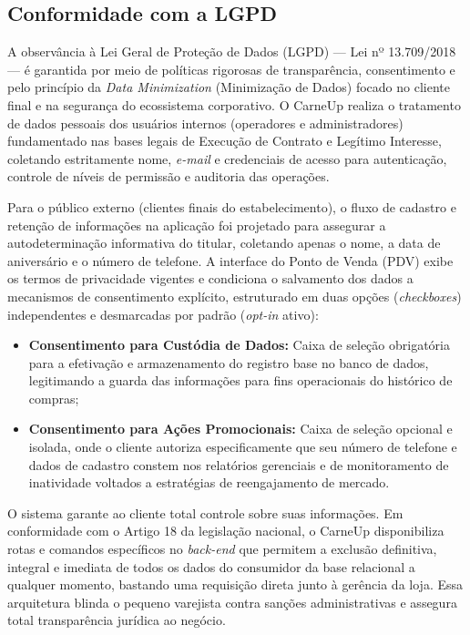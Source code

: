 \documentclass[
	12pt,				%
	openany,			%
	oneside,			%
	a4paper,			%
	english,			%
	french,				%
	spanish,			%
	brazil				%
	]{abntex2}
\begin{document}
\subsection{Conformidade com a LGPD}

A observância à Lei Geral de Proteção de Dados (LGPD) --- Lei nº 13.709/2018 --- é garantida por meio de políticas rigorosas de transparência, consentimento e pelo princípio da \textit{Data Minimization} (Minimização de Dados) focado no cliente final e na segurança do ecossistema corporativo. O CarneUp realiza o tratamento de dados pessoais dos usuários internos (operadores e administradores) fundamentado nas bases legais de Execução de Contrato e Legítimo Interesse, coletando estritamente nome, \textit{e-mail} e credenciais de acesso para autenticação, controle de níveis de permissão e auditoria das operações.

Para o público externo (clientes finais do estabelecimento), o fluxo de cadastro e retenção de informações na aplicação foi projetado para assegurar a autodeterminação informativa do titular, coletando apenas o nome, a data de aniversário e o número de telefone. A interface do Ponto de Venda (PDV) exibe os termos de privacidade vigentes e condiciona o salvamento dos dados a mecanismos de consentimento explícito, estruturado em duas opções (\textit{checkboxes}) independentes e desmarcadas por padrão (\textit{opt-in} ativo):

\begin{itemize}
    \item \textbf{Consentimento para Custódia de Dados:} Caixa de seleção obrigatória para a efetivação e armazenamento do registro base no banco de dados, legitimando a guarda das informações para fins operacionais do histórico de compras;
    \item \textbf{Consentimento para Ações Promocionais:} Caixa de seleção opcional e isolada, onde o cliente autoriza especificamente que seu número de telefone e dados de cadastro constem nos relatórios gerenciais e de monitoramento de inatividade voltados a estratégias de reengajamento de mercado.
\end{itemize}

O sistema garante ao cliente total controle sobre suas informações. Em conformidade com o Artigo 18 da legislação nacional, o CarneUp disponibiliza rotas e comandos específicos no \textit{back-end} que permitem a exclusão definitiva, integral e imediata de todos os dados do consumidor da base relacional a qualquer momento, bastando uma requisição direta junto à gerência da loja. Essa arquitetura blinda o pequeno varejista contra sanções administrativas e assegura total transparência jurídica ao negócio.
\end{document}
